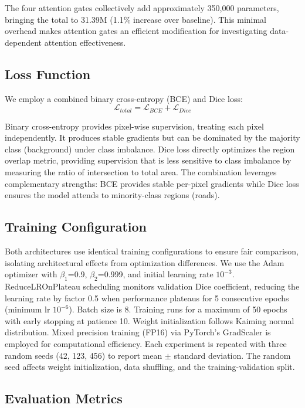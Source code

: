 \documentclass[conference]{IEEEtran}
\begin{document}
The four attention gates collectively add approximately 350,000 parameters, bringing the total to 31.39M (1.1\% increase over baseline). This minimal overhead makes attention gates an efficient modification for investigating data-dependent attention effectiveness.

\subsection{Loss Function}

We employ a combined binary cross-entropy (BCE) and Dice loss:
\begin{equation}
\mathcal{L}_{total} = \mathcal{L}_{BCE} + \mathcal{L}_{Dice}
\end{equation}

Binary cross-entropy provides pixel-wise supervision, treating each pixel independently. It produces stable gradients but can be dominated by the majority class (background) under class imbalance. Dice loss directly optimizes the region overlap metric, providing supervision that is less sensitive to class imbalance by measuring the ratio of intersection to total area. The combination leverages complementary strengths: BCE provides stable per-pixel gradients while Dice loss ensures the model attends to minority-class regions (roads).

\subsection{Training Configuration}

Both architectures use identical training configurations to ensure fair comparison, isolating architectural effects from optimization differences. We use the Adam optimizer with $\beta_1$=0.9, $\beta_2$=0.999, and initial learning rate $10^{-3}$. ReduceLROnPlateau scheduling monitors validation Dice coefficient, reducing the learning rate by factor 0.5 when performance plateaus for 5 consecutive epochs (minimum lr $10^{-6}$). Batch size is 8. Training runs for a maximum of 50 epochs with early stopping at patience 10. Weight initialization follows Kaiming normal distribution. Mixed precision training (FP16) via PyTorch's GradScaler is employed for computational efficiency. Each experiment is repeated with three random seeds (42, 123, 456) to report mean $\pm$ standard deviation. The random seed affects weight initialization, data shuffling, and the training-validation split.

\subsection{Evaluation Metrics}
\end{document}
